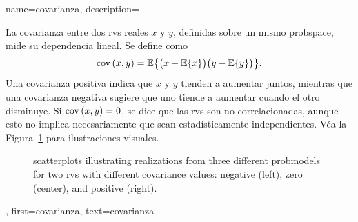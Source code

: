    {name={covarianza}, 
	description={La covarianza entre dos \glspl{rv} reales $x$ y $y$, definidas sobre un mismo \gls{probspace}, mide su dependencia lineal. Se define como 
			   $$
			   {\rm cov}\left(x,y\right) = \mathbb{E}\big\{ \big(x - \mathbb{E}\{ x\} \big)\big(y - \mathbb{E}\{y\} \big)\big\}.
			   $$
			   Una covarianza positiva indica que $x$ y $y$ tienden a aumentar juntos, mientras que una covarianza negativa sugiere que uno tiende a aumentar cuando el otro disminuye. Si ${\rm cov}\left(x,y\right) = 0$, se dice que las \glspl{rv} son no correlacionadas, aunque esto no implica necesariamente que sean estadísticamente independientes. Véa la Figura~\ref{fig:covariance-examples_dict} para ilustraciones visuales.
		   \begin{figure}[H]
			   \caption{\Glspl{scatterplot} illustrating \glspl{realization} from three different \glspl{probmodel} for two 
				   \glspl{rv} with different covariance values: negative (left), zero (center), and positive (right).}
			   \label{fig:covariance-examples_dict}
		   \end{figure}
		   },
	   first={covarianza},
	   text={covarianza} 
   }


